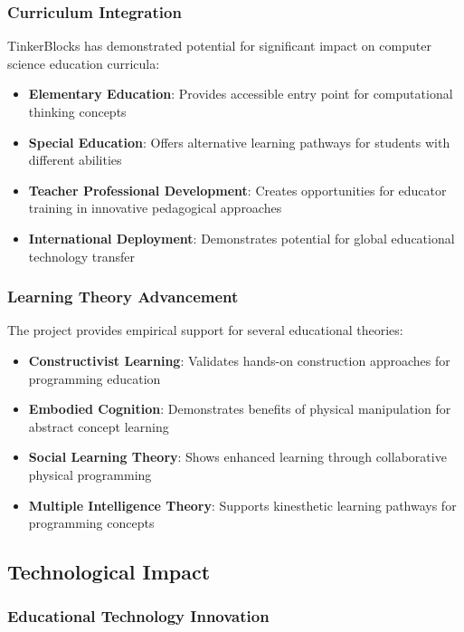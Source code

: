 \subsubsection{Curriculum Integration}

TinkerBlocks has demonstrated potential for significant impact on computer science education curricula:

\begin{itemize}
    \item \textbf{Elementary Education}: Provides accessible entry point for computational thinking concepts
    \item \textbf{Special Education}: Offers alternative learning pathways for students with different abilities
    \item \textbf{Teacher Professional Development}: Creates opportunities for educator training in innovative pedagogical approaches
    \item \textbf{International Deployment}: Demonstrates potential for global educational technology transfer
\end{itemize}

\subsubsection{Learning Theory Advancement}

The project provides empirical support for several educational theories:

\begin{itemize}
    \item \textbf{Constructivist Learning}: Validates hands-on construction approaches for programming education
    \item \textbf{Embodied Cognition}: Demonstrates benefits of physical manipulation for abstract concept learning
    \item \textbf{Social Learning Theory}: Shows enhanced learning through collaborative physical programming
    \item \textbf{Multiple Intelligence Theory}: Supports kinesthetic learning pathways for programming concepts
\end{itemize}

\subsection{Technological Impact}

\subsubsection{Educational Technology Innovation}

